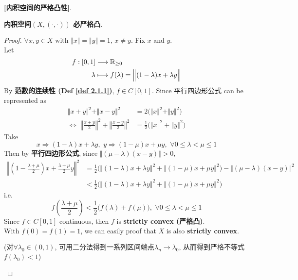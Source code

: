 	\begin{proposition}\label{prop 3.3.1}
		\textbf{[内积空间的严格凸性]}. 
		\begin{center}
			\textbf{内积空间$(X , (\cdot , \cdot))$ 必严格凸}.
		\end{center}
		
		\vspace{4em}
		
		\begin{proof}
			$\forall x , y \in X$ with $\Vert x \Vert = \Vert y \Vert = 1$, $x \neq y$. Fix $x$ and $y$. \\
			Let
			\begin{align}
				f : [0 , 1] &\longrightarrow \mathbb{R}_{\geq 0} \\
				\lambda &\longmapsto f(\lambda) = \Big\Vert (1 - \lambda) x + \lambda y \Big\Vert
			\end{align}
			By \textbf{范数的连续性 (Def \ref{def 2.1.1})}, $f \in C[0 , 1]$. Since 平行四边形公式 can be represented as
			\begin{align}
				\Vert x + y \Vert^2 + \Vert x - y \Vert^2 
				&= 2 \Big( \Vert x \Vert^2 + \Vert y \Vert^2 \Big) \\
				\Leftrightarrow \,\, 
				\left\Vert \frac{x + y}{2} \right\Vert^2 + \left\Vert \frac{x - y}{2} \right\Vert^2 
				&= \frac{1}{2} \Big( \left\Vert x \right\Vert^2 + \left\Vert y \right\Vert^2 \Big)
			\end{align}
			Take 
			\[ x \Rightarrow (1 - \lambda)x + \lambda y , \,\, y \Rightarrow (1 - \mu)x + \mu y , \,\, \forall 0 \leq \lambda < \mu \leq 1  \]
			Then by \textbf{平行四边形公式}, since $\Big\Vert (\mu - \lambda)(x - y) \Big\Vert > 0$, 
			\begin{align}
				\left\Vert \left( 1 - \frac{\lambda + \mu}{2} \right) x + \frac{\lambda + \mu}{2} y  \right\Vert^2 
				&= \frac{1}{2} \Big( \Big\Vert (1 - \lambda)x + \lambda y \Big\Vert^2 + \Big\Vert (1 - \mu)x + \mu y \Big\Vert^2 \Big) - \Big\Vert (\mu - \lambda)(x - y) \Big\Vert^2 \\
				&< \frac{1}{2} \Big( \Big\Vert (1 - \lambda)x + \lambda y \Big\Vert^2 + \Big\Vert (1 - \mu)x + \mu y \Big\Vert^2 \Big)
			\end{align}
			i.e. 
			\[ f\left( \frac{\lambda + \mu}{2} \right) < \frac{1}{2} \Big( f\left( \lambda \right) + f(\mu) \Big) , \,\, \forall 0 \leq \lambda < \mu \leq 1 \]
			Since $f \in C[0 , 1]$ continuous, then $f$ is \textbf{strictly convex (严格凸)}. \\
			With $f(0) = f(1) = 1$, we can easily proof that $X$ is also \textbf{strictly convex}. 
			\begin{center}
				(对$\forall \lambda_0 \in (0 , 1)$, 可用二分法得到一系列区间端点$\lambda_n \to \lambda_0$, 从而得到严格不等式$f(\lambda_0) < 1$)
			\end{center}
		\end{proof}
	\end{proposition}


